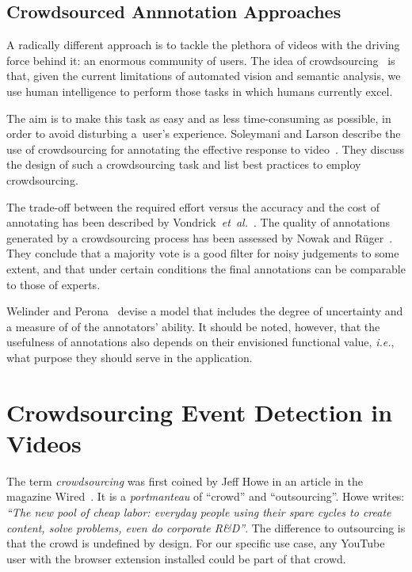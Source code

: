 \documentclass[runningheads,a4paper]{llncs}
\begin{document}
\subsection{Crowdsourced Annnotation Approaches}
A radically different approach is to tackle the plethora of videos with the driving force behind it: an enormous community of users. The idea of crowdsourcing~\cite{Doan:2011} is that, given the current limitations of automated vision and semantic analysis, we use human intelligence to perform those tasks in which humans currently excel.

The aim is to make this task as easy and as less time-consuming as possible, in order to avoid disturbing a~user's experience. Soleymani and Larson describe the use of crowdsourcing for annotating the effective response to video~\cite{Soleymani:2010}. They discuss the design of such a crowdsourcing task and list best practices to employ crowdsourcing. 

The trade-off between the required effort versus the accuracy and the cost of annotating has been described by Vondrick~\emph{et~al.}~\cite{Vondrick:2010}. The quality of annotations generated by a crowdsourcing process has been assessed by Nowak and R\"{u}ger~\cite{Nowak:2010}. They conclude that a majority vote is a good filter for noisy judgements to some extent, and that under certain conditions the final annotations can be comparable to those of experts. 

Welinder and Perona~\cite{Welinder:2010} devise a model that includes the degree of uncertainty and a measure of of the annotators' ability. It should be noted, however, that the usefulness of annotations also depends on their envisioned functional value, \emph{i.e.}, what purpose they should serve in the application.

\section{Crowdsourcing Event Detection in Videos} \label{sec:crowdsourcing}
The term \emph{crowdsourcing} was first coined by Jeff Howe in an article in the magazine Wired~\cite{crowdsourcing}. It is a \textit{portmanteau} of ``crowd'' and ``outsourcing''. Howe writes: \textit{``The new pool of cheap labor: everyday people using their spare cycles to create content, solve problems, even do corporate R\&D''}. The difference to outsourcing is that the crowd is undefined by design. For our specific use case, any YouTube user with the browser extension installed could be part of that crowd. 
\end{document}
